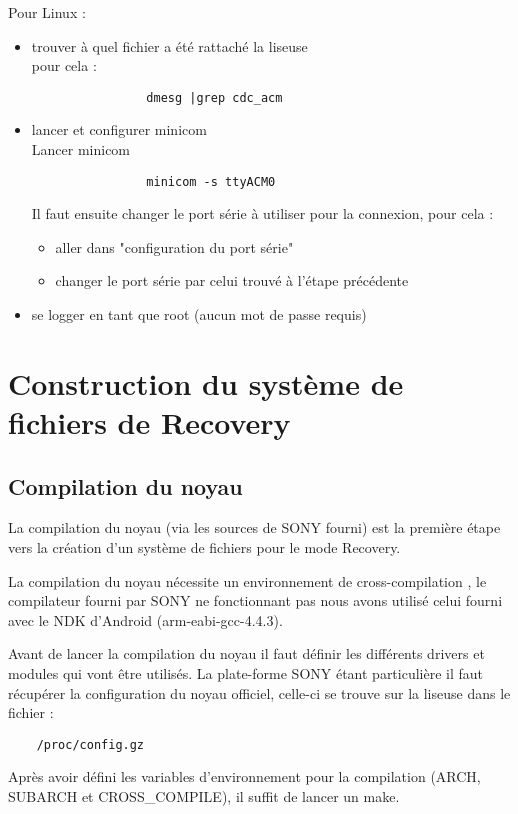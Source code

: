 Pour Linux : 
\begin{itemize}
\renewcommand{\labelitemi}{$\bullet$}
	\item trouver à quel fichier a été rattaché la liseuse \\
		pour cela : 
			\begin{verbatim}
				dmesg |grep cdc_acm
			\end{verbatim}
	\item lancer et configurer minicom \\
		Lancer minicom\\
			\begin{verbatim}
				minicom -s ttyACM0
			\end{verbatim}
		Il faut ensuite changer le port série à utiliser pour la connexion, pour cela : \\	
		\begin{itemize}
			\item aller dans "configuration du port série"
			\item changer le port série par celui trouvé à l'étape précédente
		\end{itemize}
	\item se logger en tant que root (aucun mot de passe requis)
\end{itemize}

\section{Construction du système de fichiers de Recovery}
\subsection{Compilation du noyau}

La compilation du noyau (via les sources de SONY fourni) est la première étape vers la création d'un système de fichiers pour le mode Recovery.

La compilation du noyau nécessite un environnement de cross-compilation , le compilateur fourni par SONY ne fonctionnant pas nous avons utilisé celui fourni avec le NDK d'Android (arm-eabi-gcc-4.4.3).

Avant de lancer la compilation du noyau il faut définir les différents drivers et modules qui vont être utilisés. La plate-forme SONY étant particulière il faut récupérer la configuration du noyau officiel, celle-ci se trouve sur la liseuse dans le fichier : 
\begin{verbatim}
	/proc/config.gz
\end{verbatim}
 Après avoir défini les variables d'environnement pour la compilation (ARCH, SUBARCH et CROSS_COMPILE), il suffit de lancer un make.
 
